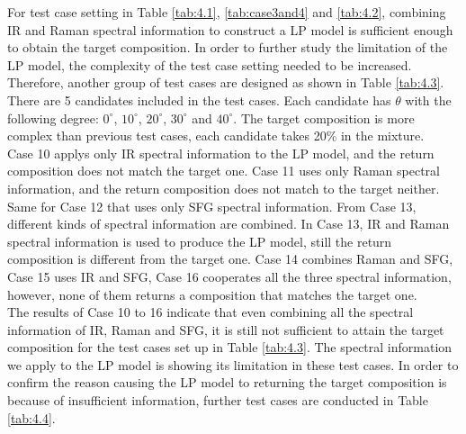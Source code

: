 For test case setting in Table \ref{tab:4.1}, \ref{tab:case3and4} and \ref{tab:4.2}, combining IR and Raman spectral information to construct a LP model is sufficient enough to obtain the target composition. In order to further study the limitation of the LP model, the complexity of the test case setting needed to be increased. Therefore, another group of test cases are designed as shown in Table \ref{tab:4.3}. There are 5 candidates included in the test cases. Each candidate has $\theta$ with the following degree: $0^{\circ}$, $10^{\circ}$, $20^{\circ}$, $30^{\circ}$ and $40^{\circ}$. The target composition is more complex than previous test cases, each candidate takes 20\% in the mixture. \\

Case 10 applys only IR spectral information to the LP model, and the return composition does not match the target one. Case 11 uses only Raman spectral information, and the return composition does not match to the target neither. Same for Case 12 that uses only SFG spectral information. From Case 13, different kinds of spectral information are combined. In Case 13, IR and Raman spectral information is used to produce the LP model, still the return composition is different from the target one. Case 14 combines Raman and SFG, Case 15 uses IR and SFG, Case 16 cooperates all the three spectral information, however, none of them returns a composition that matches the target one. \\

The results of Case 10 to 16 indicate that even combining all the spectral information of IR, Raman and SFG, it is still not sufficient to attain the target composition for the test cases set up in Table \ref{tab:4.3}. The spectral information we apply to the LP model is showing its limitation in these test cases. In order to confirm the reason causing the LP model to returning the target composition is because of insufficient information, further test cases are conducted in Table \ref{tab:4.4}. \\

